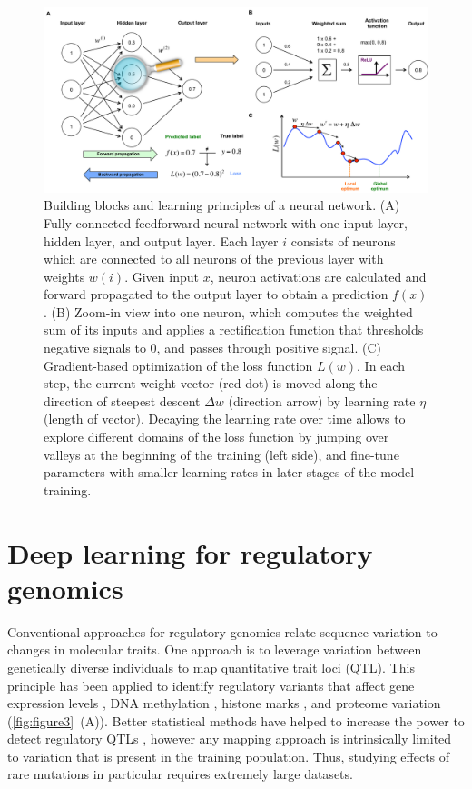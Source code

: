 \begin{figure}[htbp!]
\centering
\includegraphics[width=1.0\textwidth]{figure2}
\caption[Building blocks and learning principles of a neural network.]{Building blocks and learning principles of a neural network. (A) Fully connected feedforward neural network with one input layer, hidden layer, and output layer.  Each layer $i$ consists of neurons which are connected to all neurons of the previous layer with weights $w(i)$. Given input $x$, neuron activations are calculated and forward propagated to the output layer to obtain a prediction $f(x)$. (B) Zoom-in view into one neuron, which computes the weighted sum of its inputs and applies a rectification function that thresholds negative signals to $0$, and passes through positive signal. (C) Gradient-based optimization of the loss function $L(w)$. In each step, the current weight vector (red dot) is moved along the direction of steepest descent $\Delta w$ (direction arrow) by learning rate $\eta$ (length of vector). Decaying the learning rate over time allows to explore different domains of the loss function by jumping over valleys at the beginning of the training (left side), and fine-tune parameters with smaller learning rates in later stages of the model training.}
\label{fig:figure2}
\end{figure}


\section{Deep learning for regulatory genomics}
Conventional approaches for regulatory genomics relate sequence variation to changes in molecular traits. One approach is to leverage variation between genetically diverse individuals to map quantitative trait loci (QTL). This principle has been applied to identify regulatory variants that affect gene expression levels \citep{montgomery_transcriptome_2010,pickrell_understanding_2010}, DNA methylation \citep{bell_dna_2011,gibbs_abundant_2010}, histone marks \citep{grubert_genetic_2015,waszak_population_2015}, and proteome variation \citep{albert_genetics_2014,battle_genomic_2015,parts_heritability_2014,vincent_stacked_2010} (\autoref{fig:figure3}~(A)). Better statistical methods have helped to increase the power to detect regulatory QTLs \citep{kang_accurate_2008,parts_joint_2011,rakitsch_modelling_2016,stegle_bayesian_2010}, however any mapping approach is intrinsically limited to variation that is present in the training population. Thus, studying effects of rare mutations in particular requires extremely large datasets.


